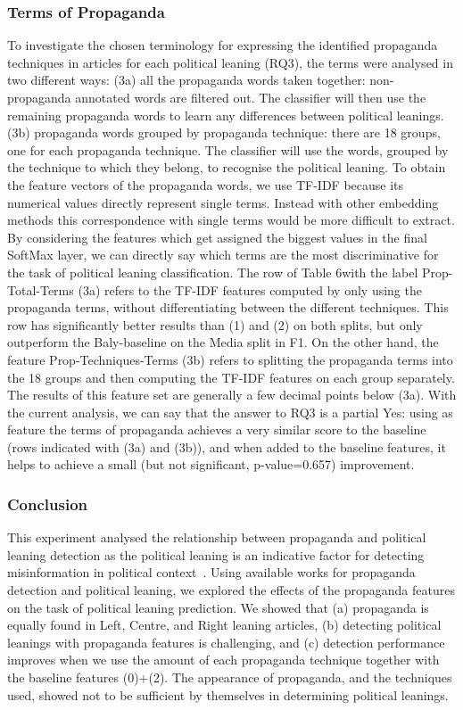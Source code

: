 \subsubsection{Terms of Propaganda}

To investigate the chosen terminology for expressing the identified propaganda techniques in articles for each political leaning (RQ3), the terms were analysed in two different ways:
(3a) all the propaganda words taken together: non-propaganda annotated words are filtered out. The classifier will then use the remaining propaganda words to learn any differences between political leanings.
(3b) propaganda words grouped by propaganda technique: there are 18 groups, one for each propaganda technique. The classifier will use the words, grouped by the technique to which they belong, to recognise the political leaning.
To obtain the feature vectors of the propaganda words, we use TF-IDF because its numerical values directly represent single terms. Instead with other embedding methods  this correspondence with single terms would be more difficult to extract. By considering the features which get assigned the biggest values in the final SoftMax layer, we can directly say which terms are the most discriminative for the task of political leaning classification. 
The row of Table 6with the label Prop-Total-Terms (3a) refers to the TF-IDF features computed by only using the propaganda terms, without differentiating between the different techniques. This row has significantly better results than (1) and (2) on both splits, but only outperform the Baly-baseline on the Media split in F1.
On the other hand, the feature Prop-Techniques-Terms (3b) refers to splitting the propaganda terms into the 18 groups and then computing the TF-IDF features on each group separately. The results of this feature set are generally a few decimal points below (3a).
With the current analysis, we can say that the answer to RQ3 is a partial Yes: using as feature the terms of propaganda achieves a very similar score to the baseline (rows indicated with (3a) and (3b)), and when added to the baseline features, it helps to achieve a small (but not significant, p-value=0.657) improvement.


\subsubsection{Conclusion}

This experiment analysed the relationship between propaganda and political leaning detection as the political leaning is an indicative factor for detecting misinformation in political context~\citep{spezzano2021s}. Using available works for propaganda detection and political leaning, we explored the effects of the propaganda features on the task of political leaning prediction. We showed that (a) propaganda is equally found in Left, Centre, and Right leaning articles, (b) detecting political leanings with propaganda features is challenging, and (c) detection performance improves when we use the amount of each propaganda technique together with the baseline features (0)+(2). The appearance of propaganda, and the techniques used, showed not to be sufficient by themselves in determining political leanings.




